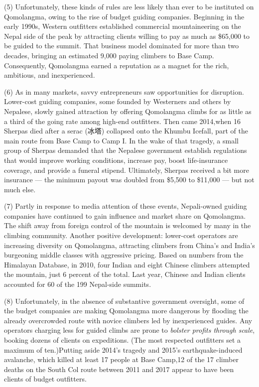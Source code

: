 \documentclass[UTF8,11pt]{ctexart}
\begin{document}
(5) Unfortunately, these kinds of rules are less likely than ever to be instituted on Qomolangma, owing to the rise of budget guiding companies. Beginning in the early 1990s, Western outfitters established commercial mountaineering on the Nepal side of the peak by attracting clients willing to pay as much as \$65,000 to be guided to the summit. That business model dominated for more than two decades, bringing an estimated 9,000 paying climbers to Base Camp. Consequently, Qomolangma earned a reputation as a magnet for the rich, ambitious, and inexperienced.


(6) As in many markets, savvy entrepreneurs saw opportunities for disruption. Lower-cost guiding companies, some founded by Westerners and others by Nepalese, slowly gained attraction by offering Qomolangma climbs for as little as a third of the going rate among high-end outfitters. Then came 2014,when 16 Sherpas died after a serac (冰塔) collapsed onto the Khumbu Icefall, part of the main route from Base Camp to Camp I. In the wake of that tragedy, a small group of Sherpas demanded that the Nepalese government establish regulations that would improve working conditions, increase pay, boost life-insurance coverage, and provide a funeral stipend. Ultimately, Sherpas received a bit more insurance — the minimum payout was doubled from \$5,500 to \$11,000 — but not much else.


(7) Partly in response to media attention of these events, Nepali-owned guiding companies have continued to gain influence and market share on Qomolangma. The shift away from foreign control of the mountain is welcomed by many in the climbing community. Another positive development: lower-cost operators are increasing diversity on Qomolangma, attracting climbers from China’s and India’s burgeoning middle classes with aggressive pricing. Based on numbers from the Himalayan Database, in 2010, four Indian and eight Chinese climbers attempted the mountain, just 6 percent of the total. Last year, Chinese and Indian clients accounted for 60 of the 199 Nepal-side summits.


(8) Unfortunately, in the absence of substantive government oversight, some of the budget companies are making Qomolangma more dangerous by flooding the already overcrowded route with novice climbers led by inexperienced guides. Any operators charging less for guided climbs are prone to \textit{bolster profits through scale}, booking dozens of clients on expeditions. (The most respected outfitters set a maximum of ten.)Putting aside 2014’s tragedy and 2015’s earthquake-induced avalanche, which killed at least 17 people at Base Camp,12 of the 17 climber deaths on the South Col route between 2011 and 2017 appear to have been clients of budget outfitters.
\end{document}
